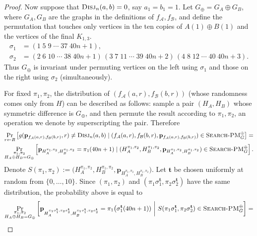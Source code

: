\documentclass[11pt]{article}
\newcommand{\scterm}[1]{{\textrm{\sc #1}}}
\newcommand{\disj}{\scterm{Disj}}
\newcommand{\xorPM}{\textsc{Search-PM}^\oplus}
\newcommand{\Alice}{\mathcal{A}}
\newcommand{\Bob}{\mathcal{B}}
\numberwithin{equation}{section}
\begin{document}
\begin{proof}
Now suppose that $\disj_n(a,b) = 0$, say $a_1 = b_1 = 1$. Let $G_{\oplus} = G_A \oplus G_B$, where $G_A,G_B$ are the graphs in the definitions of $f_{\Alice},f_{\Bob}$, and define 
the permutation that touches only vertices in the ten copies of $A(1)\oplus B(1)$ and the vertices of the final $K_{1,3}$.
\begin{align*}
\sigma_1 &= (1 \; 5 \; 9 \; \cdots \; 37 \; 40n+1), \\
\sigma_2 &= (2 \; 6 \; 10 \; \cdots \; 38 \; 40n+1) \, (3 \; 7 \; 11 \; \cdots \; 39 \; 40n+2) \,
 (4 \; 8 \; 12 \; \cdots \; 40 \; 40n+3).
\end{align*}
Thus $G_\oplus$ is invariant under permuting vertices on the left using $\sigma_1$ and those on the right using $\sigma_2$ (simultaneously).

For fixed $\pi_1,\pi_2$, the distribution of $(f_{\Alice}(a,r),f_{\Bob}(b,r))$ (whose randomness comes only from $H$) can be described as follows: sample a pair $(H_A,H_B)$ whose symmetric difference is $G_\oplus$, and then permute the result according to $\pi_1,\pi_2$, an operation we denote by superscripting the pair. Therefore
\begin{gather*}
\Pr_{r \gets R} \left[g(\mathbf{p}_{f_{\Alice}(a,r), f_{\Bob}(b,r)},r) \neq \disj_n(a,b) \mid (f_{\Alice}(a, r), f_{\Bob}(b, r), \mathbf{p}_{f_{\Alice}(a,r), f_{\Bob}(b,r)}) \in \xorPM_G \right] = \\
\Pr_{\substack{\pi_1,\pi_2 \\ H_A \oplus H_B = G_\oplus}}
\left[ \mathbf{p}_{H_A^{\pi_1,\pi_2},H_B^{\pi_1,\pi_2}} = \pi_1(40n+1) \mid (H_A^{\pi_1,\pi_2},H_B^{\pi_1,\pi_2},\mathbf{p}_{H_A^{\pi_1,\pi_2},H_B^{\pi_1,\pi_2}}) \in \xorPM_G \right].
\end{gather*}
Denote $S(\pi_1, \pi_2) := \bigl(H_A^{\pi_1,\pi_2},H_B^{\pi_1,\pi_2},\mathbf{p}_{H_A^{\pi_1,\pi_2},H_B^{\pi_1,\pi_2}}\bigr)$.
Let $\mathbf{t}$ be chosen uniformly at random from $\{0,\dotsc,10\}$. 
Since $(\pi_1,\pi_2)$ and $(\pi_1\sigma_1^{\mathbf{t}},\pi_2\sigma_2^{\mathbf{t}})$ have the same distribution, the probability above is equal to
\[
\begin{aligned}
 \Pr_{\substack{\pi_1,\pi_2 \\ H_A \oplus H_B = G_\oplus}}
&\left[ \mathbf{p}_{H_A^{\pi_1 \sigma_1^{\mathbf{t}},\pi_2 \sigma_2^{\mathbf{t}}},H_B^{\pi_1 \sigma_1^{\mathbf{t}},\pi_2 \sigma_2^{\mathbf{t}}}} = \pi_1 \bigl(\sigma_1^{\mathbf{t}}(40n+1))\ \middle|\ S(\pi_1 \sigma_1^{\mathbf{t}},\pi_2 \sigma_2^{\mathbf{t}}) \in \xorPM_G \right] = \\

\end{aligned}\]
\end{proof}
\end{document}
